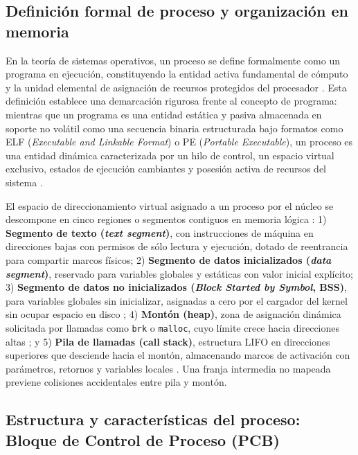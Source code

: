 \documentclass[12pt]{article}
\begin{document}
\subsection{Definición formal de proceso y organización en memoria}

En la teoría de sistemas operativos, un proceso se define formalmente como un programa en ejecución, constituyendo la entidad activa fundamental de cómputo y la unidad elemental de asignación de recursos protegidos del procesador \parencite[\S 3.1.1, p.\ 73]{silberschatz2006fundamentos}. Esta definición establece una demarcación rigurosa frente al concepto de programa: mientras que un programa es una entidad estática y pasiva almacenada en soporte no volátil como una secuencia binaria estructurada bajo formatos como ELF (\textit{Executable and Linkable Format}) o PE (\textit{Portable Executable}), un proceso es una entidad dinámica caracterizada por un hilo de control, un espacio virtual exclusivo, estados de ejecución cambiantes y posesión activa de recursos del sistema \parencite[\S 3.1, p.\ 131]{stallings2018operating}.

El espacio de direccionamiento virtual asignado a un proceso por el núcleo se descompone en cinco regiones o segmentos contiguos en memoria lógica \parencite[\S 3.3.2, p.\ 103]{carretero2001sistemas}: 1) \textbf{Segmento de texto (\textit{text segment})}, con instrucciones de máquina en direcciones bajas con permisos de sólo lectura y ejecución, dotado de reentrancia para compartir marcos físicos; 2) \textbf{Segmento de datos inicializados (\textit{data segment})}, reservado para variables globales y estáticas con valor inicial explícito; 3) \textbf{Segmento de datos no inicializados (\textit{Block Started by Symbol}, BSS)}, para variables globales sin inicializar, asignadas a cero por el cargador del kernel sin ocupar espacio en disco \parencite[\S 3.3.2, p.\ 104]{carretero2001sistemas}; 4) \textbf{Montón (heap)}, zona de asignación dinámica solicitada por llamadas como \texttt{brk} o \texttt{malloc}, cuyo límite crece hacia direcciones altas \parencite[\S 3.1.1, p.\ 74]{silberschatz2006fundamentos}; y 5) \textbf{Pila de llamadas (call stack)}, estructura LIFO en direcciones superiores que desciende hacia el montón, almacenando marcos de activación con parámetros, retornos y variables locales \parencite[\S 3.3, p.\ 151]{stallings2018operating}. Una franja intermedia no mapeada previene colisiones accidentales entre pila y montón.

\subsection{Estructura y características del proceso: Bloque de Control de Proceso (PCB)}
\end{document}
